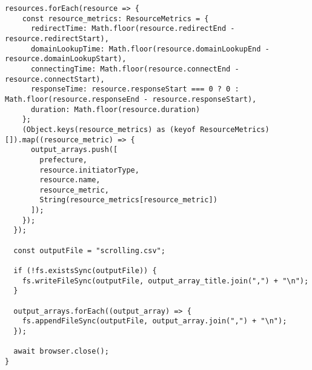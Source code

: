 \begin{lstlisting}[caption={PuppeteerとResource Timing APIを用いたスクロール時の画像の読み込み時間の計測},label={lst:PuppeteerとResource Timing APIを用いたスクロール時の画像の読み込み時間の計測}]
  resources.forEach(resource => {
    const resource_metrics: ResourceMetrics = {
      redirectTime: Math.floor(resource.redirectEnd - resource.redirectStart),
      domainLookupTime: Math.floor(resource.domainLookupEnd - resource.domainLookupStart),
      connectingTime: Math.floor(resource.connectEnd - resource.connectStart),
      responseTime: resource.responseStart === 0 ? 0 : Math.floor(resource.responseEnd - resource.responseStart),
      duration: Math.floor(resource.duration)
    };
    (Object.keys(resource_metrics) as (keyof ResourceMetrics)[]).map((resource_metric) => {
      output_arrays.push([
        prefecture,
        resource.initiatorType,
        resource.name,
        resource_metric,
        String(resource_metrics[resource_metric])
      ]);
    });
  });

  const outputFile = "scrolling.csv";

  if (!fs.existsSync(outputFile)) {
    fs.writeFileSync(outputFile, output_array_title.join(",") + "\n");
  }

  output_arrays.forEach((output_array) => {
    fs.appendFileSync(outputFile, output_array.join(",") + "\n");
  });

  await browser.close();
}

\end{lstlisting}

